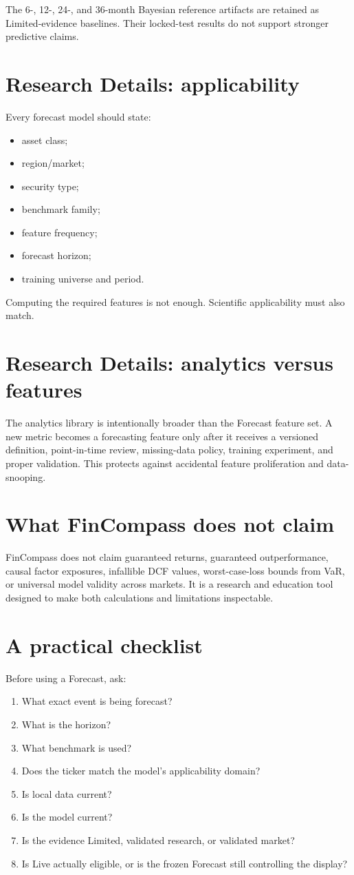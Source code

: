 \documentclass[11pt]{article}
\begin{document}
The 6-, 12-, 24-, and 36-month Bayesian reference artifacts are retained as Limited-evidence baselines. Their locked-test results do not support stronger predictive claims.

\section{Research Details: applicability}
Every forecast model should state:
\begin{itemize}
\item asset class;
\item region/market;
\item security type;
\item benchmark family;
\item feature frequency;
\item forecast horizon;
\item training universe and period.
\end{itemize}
Computing the required features is not enough. Scientific applicability must also match.

\section{Research Details: analytics versus features}
The analytics library is intentionally broader than the Forecast feature set. A new metric becomes a forecasting feature only after it receives a versioned definition, point-in-time review, missing-data policy, training experiment, and proper validation. This protects against accidental feature proliferation and data-snooping.

\section{What FinCompass does not claim}
FinCompass does not claim guaranteed returns, guaranteed outperformance, causal factor exposures, infallible DCF values, worst-case-loss bounds from VaR, or universal model validity across markets. It is a research and education tool designed to make both calculations and limitations inspectable.

\section{A practical checklist}
Before using a Forecast, ask:
\begin{enumerate}
\item What exact event is being forecast?
\item What is the horizon?
\item What benchmark is used?
\item Does the ticker match the model's applicability domain?
\item Is local data current?
\item Is the model current?
\item Is the evidence Limited, validated research, or validated market?
\item Is Live actually eligible, or is the frozen Forecast still controlling the display?
\end{enumerate}
\end{document}
